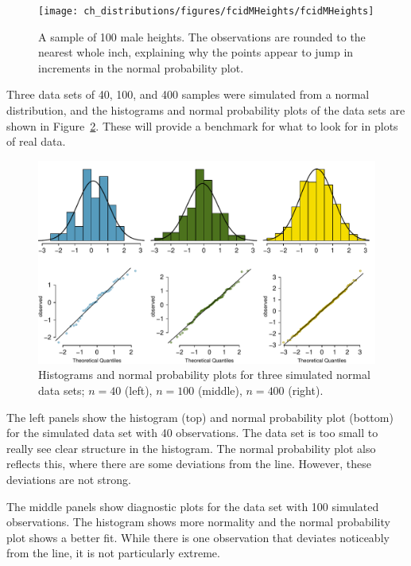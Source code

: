 \begin{figure}[ht]
\centering
\texttt{[image: ch\_distributions/figures/fcidMHeights/fcidMHeights]}
\caption{A sample of 100 male heights. The observations are rounded to the nearest whole inch, explaining why the points appear to jump in increments in the normal probability plot.}
\label{fcidMHeights}
\end{figure}

\textA{\pagebreak}

\begin{example}{Three data sets of 40, 100, and 400 samples were simulated from a normal distribution, and the histograms and normal probability plots of the data sets are shown in Figure~\ref{normalExamples}. These will provide a benchmark for what to look for in plots of real data.} \label{normalExamplesExample}

\begin{figure}
\centering
\includegraphics[width=\textwidth]{ch_distributions/figures/normalExamples/normalExamples}
\caption{Histograms and normal probability plots for three simulated normal data sets; $n=40$ (left), $n=100$ (middle), $n=400$ (right).}
\label{normalExamples}
\end{figure}

The left panels show the histogram (top) and normal probability plot (bottom) for the simulated data set with 40 observations. The data set is too small to really see clear structure in the histogram. The normal probability plot also reflects this, where there are some deviations from the line. However, these deviations are not strong.

The middle panels show diagnostic plots for the data set with 100 simulated observations. The histogram shows more normality and the normal probability plot shows a better fit. While there is one observation that deviates noticeably from the line, it is not particularly extreme.


\end{example}
